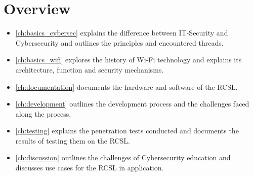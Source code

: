 \section{Overview}
\begin{itemize}
    \item \cref{ch:basics_cybersec} explains the difference between IT-Security and Cybersecurity and outlines the principles and encountered threads.
    \item \cref{ch:basics_wifi} explores the history of Wi-Fi technology and explains its architecture, function and security mechanisms.
    \item \cref{ch:documentation} documents the hardware and software of the RCSL.
    \item \cref{ch:development} outlines the development process and the challenges faced along the process.
    \item \cref{ch:testing} explains the penetration tests conducted and documents the results of testing them on the RCSL.
    \item \cref{ch:discussion} outlines the challenges of Cybersecurity education and discusses use cases for the RCSL in application.
\end{itemize}